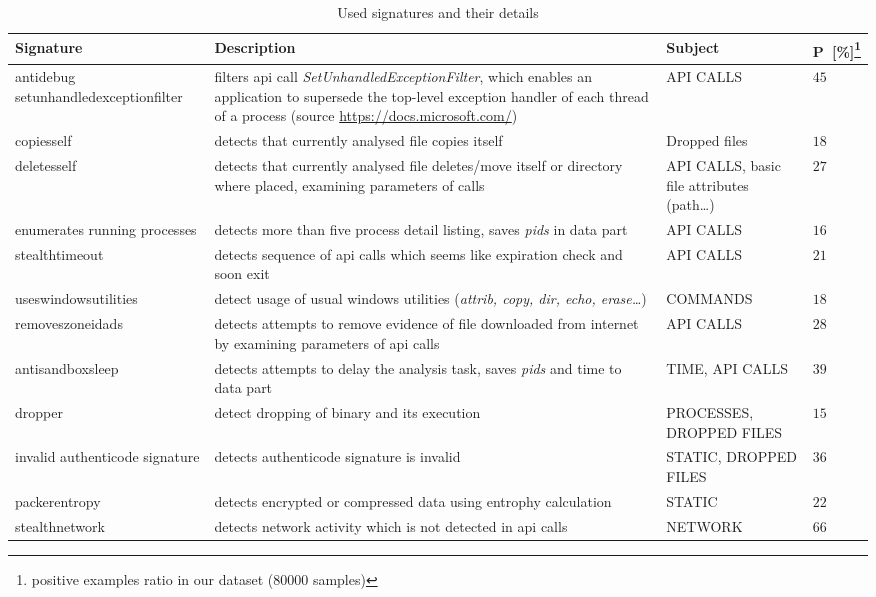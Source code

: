 \begin{table}[h]
  \centering
  \caption{Used signatures and their details}
  \begin{minipage}{\linewidth}
  \begin{tabular}{p{3.5cm}p{6cm}p{3cm}p{1.3cm}}
    \toprule
    \textbf{Signature} &
    \textbf{Description} &
    \textbf{Subject} &
    \textbf{P~[\%]\footnote[1]{positive examples ratio in our dataset ($80000$ samples)}}
    \\
    \midrule
    antidebug setunhandledexceptionfilter & filters api call \emph{SetUnhandledExceptionFilter}, which enables an application to supersede the top-level exception handler of each thread of a process  (source \url{https://docs.microsoft.com/})  & API CALLS & $45$ \\
    \midrule
    copiesself & detects that currently analysed file copies itself & Dropped files & $18$ \\
    \midrule
    deletesself & detects that currently analysed file deletes/move itself or directory where placed, examining parameters of calls & API CALLS, basic file attributes (path\dots) & $27$ \\
    \midrule
    enumerates running processes & detects more than five process detail listing, saves \emph{pids} in data part & API CALLS & $16$ \\
    \midrule
    stealthtimeout & detects sequence of api calls which seems like expiration check and soon exit & API CALLS & $21$ \\
    \midrule
    useswindowsutilities & detect usage of usual windows utilities (\emph{attrib, copy, dir, echo, erase\dots}) & COMMANDS & $18$ \\
    \midrule
    removeszoneidads & detects attempts to remove evidence of file downloaded from internet by examining parameters of api calls& API CALLS & $28$ \\
    \midrule[0.3pt]
    \midrule[0.3pt]
    antisandboxsleep & detects attempts to delay the analysis task, saves \emph{pids} and time to data part & TIME, API CALLS & $39$ \\
    \midrule
    dropper & detect dropping of binary and its execution & PROCESSES, DROPPED FILES & $15$ \\
    \midrule
    invalid authenticode signature & detects authenticode signature is invalid & STATIC, DROPPED FILES & $36$ \\
    \midrule
    packerentropy & detects encrypted or compressed data using entrophy calculation & STATIC & $22$ \\
    \midrule
    stealthnetwork & detects network activity which is not detected in api calls & NETWORK & $66$ \\
    \bottomrule
  \end{tabular}
  \end{minipage}
  \label{tab:sigdet}
\end{table}

